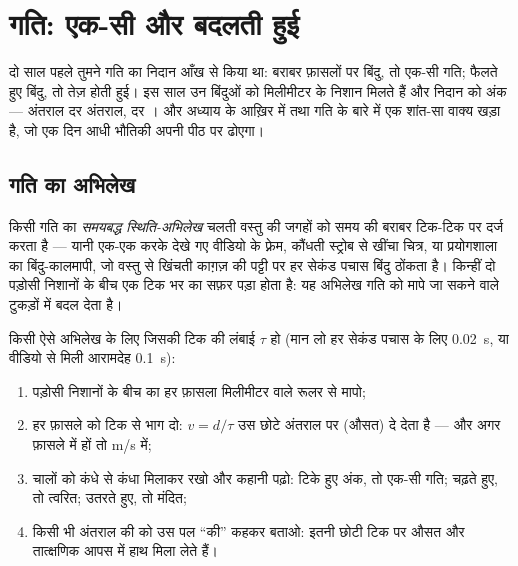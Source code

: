 \chapter{गति: एक-सी और बदलती हुई}\label{ch:g9:uniform-varied-motion}

दो साल पहले तुमने गति का निदान आँख से किया था: बराबर फ़ासलों पर बिंदु,
तो एक-सी गति; फैलते हुए बिंदु, तो तेज़ होती हुई। इस साल उन बिंदुओं को
मिलीमीटर के निशान मिलते हैं और निदान को अंक --- अंतराल दर अंतराल, 
दर । और अध्याय के आख़िर में  तथा गति के बारे में एक शांत-सा वाक्य
खड़ा है, जो एक दिन आधी भौतिकी अपनी पीठ पर ढोएगा।

\section{गति का अभिलेख}

\begin{definition}[समयबद्ध स्थिति-अभिलेख]\label{def:g9:uniform-varied-motion:record}
किसी गति का \emph{समयबद्ध स्थिति-अभिलेख}
चलती वस्तु की जगहों को समय की बराबर टिक-टिक पर दर्ज करता है --- यानी
एक-एक करके देखे गए वीडियो के फ़्रेम, कौंधती स्ट्रोब से खींचा चित्र, या
प्रयोगशाला का बिंदु-कालमापी, जो वस्तु से खिंचती काग़ज़ की पट्टी पर हर
सेकंड पचास बिंदु ठोंकता है। किन्हीं दो पड़ोसी निशानों के बीच एक टिक भर
का सफ़र पड़ा होता है: यह अभिलेख गति को मापे जा सकने वाले टुकड़ों में
बदल देता है।
\end{definition}

\begin{method}[अभिलेख को अंकों के साथ पढ़ना]\label{met:g9:uniform-varied-motion:read}
किसी ऐसे अभिलेख के लिए जिसकी टिक की लंबाई $\tau$ हो (मान लो हर सेकंड
पचास के लिए \qty{0.02}{s}, या वीडियो से मिली आरामदेह \qty{0.1}{s}):
\begin{enumerate}
  \item पड़ोसी निशानों के बीच का हर फ़ासला मिलीमीटर वाले रूलर से
        मापो;
  \item हर फ़ासले को टिक से भाग दो: $v = d/\tau$ उस छोटे अंतराल पर
        (औसत)  दे देता है --- और अगर फ़ासले  में हों तो
        \unit{m/s} में;
  \item चालों को कंधे से कंधा मिलाकर रखो और कहानी पढ़ो: टिके हुए अंक,
        तो एक-सी गति; चढ़ते हुए, तो त्वरित; उतरते हुए, तो मंदित;
  \item किसी भी अंतराल की  को उस पल ``की''  कहकर बताओ: इतनी छोटी
        टिक पर औसत और तात्क्षणिक आपस में हाथ मिला लेते हैं।
\end{enumerate}
\end{method}

